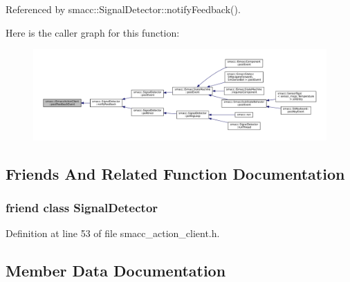 Referenced by smacc\+::\+Signal\+Detector\+::notify\+Feedback().



Here is the caller graph for this function\+:
\nopagebreak
\begin{figure}[H]
\begin{center}
\leavevmode
\includegraphics[width=350pt]{classsmacc_1_1ISmaccActionClient_af3b9ad387577ce3edcf4f0a93cf87599_icgraph}
\end{center}
\end{figure}




\subsection{Friends And Related Function Documentation}
\subsubsection[{\texorpdfstring{Signal\+Detector}{SignalDetector}}]{\setlength{\rightskip}{0pt plus 5cm}friend class {\bf Signal\+Detector}\hspace{0.3cm}{\ttfamily [friend]}}\hypertarget{classsmacc_1_1ISmaccActionClient_a9fb9044f83e768849d1b42d9d0d5508e}{}\label{classsmacc_1_1ISmaccActionClient_a9fb9044f83e768849d1b42d9d0d5508e}


Definition at line 53 of file smacc\+\_\+action\+\_\+client.\+h.



\subsection{Member Data Documentation}
